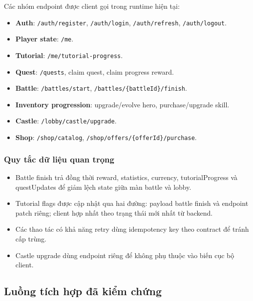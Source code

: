 Các nhóm endpoint được client gọi trong runtime hiện tại:
\begin{itemize}
    \item \textbf{Auth}: \texttt{/auth/register}, \texttt{/auth/login}, \texttt{/auth/refresh}, \texttt{/auth/logout}.
    \item \textbf{Player state}: \texttt{/me}.
    \item \textbf{Tutorial}: \texttt{/me/\allowbreak tutorial-progress}.
    \item \textbf{Quest}: \texttt{/quests}, claim quest, claim progress reward.
    \item \textbf{Battle}: \texttt{/battles/\allowbreak start}, \texttt{/battles/\allowbreak \{battleId\}/\allowbreak finish}.
    \item \textbf{Inventory progression}: upgrade/\allowbreak evolve hero, purchase/\allowbreak upgrade skill.
    \item \textbf{Castle}: \texttt{/lobby/\allowbreak castle/\allowbreak upgrade}.
    \item \textbf{Shop}: \texttt{/shop/\allowbreak catalog}, \texttt{/shop/\allowbreak offers/\allowbreak \{offerId\}/\allowbreak purchase}.
\end{itemize}

\subsubsection{Quy tắc dữ liệu quan trọng}
\label{subsubsec:impl-server-rules}

\begin{itemize}
    \item Battle finish trả đồng thời reward, statistics, currency, tutorialProgress và questUpdates để giảm lệch state giữa màn battle và lobby.
    \item Tutorial flags được cập nhật qua hai đường: payload battle finish và endpoint patch riêng; client hợp nhất theo trạng thái mới nhất từ backend.
    \item Các thao tác có khả năng retry dùng idempotency key theo contract để tránh cấp trùng.
    \item Castle upgrade dùng endpoint riêng để không phụ thuộc vào biến cục bộ client.
\end{itemize}

\subsection{Luồng tích hợp đã kiểm chứng}
\label{subsec:impl-flows}

